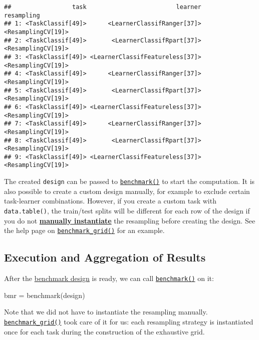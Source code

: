 \documentclass[
]{scrbook}
\newenvironment{Shaded}{\begin{snugshade}}{\end{snugshade}}
\newcommand{\FunctionTok}[1]{\textcolor[rgb]{0.00,0.00,0.00}{#1}}
\newcommand{\NormalTok}[1]{#1}
\newcommand{\OtherTok}[1]{\textcolor[rgb]{0.56,0.35,0.01}{#1}}
\renewenvironment{Shaded} {\begin{snugshade}\small} {\end{snugshade}}
\begin{document}
\begin{verbatim}
##                 task                         learner         resampling
## 1: <TaskClassif[49]>      <LearnerClassifRanger[37]> <ResamplingCV[19]>
## 2: <TaskClassif[49]>       <LearnerClassifRpart[37]> <ResamplingCV[19]>
## 3: <TaskClassif[49]> <LearnerClassifFeatureless[37]> <ResamplingCV[19]>
## 4: <TaskClassif[49]>      <LearnerClassifRanger[37]> <ResamplingCV[19]>
## 5: <TaskClassif[49]>       <LearnerClassifRpart[37]> <ResamplingCV[19]>
## 6: <TaskClassif[49]> <LearnerClassifFeatureless[37]> <ResamplingCV[19]>
## 7: <TaskClassif[49]>      <LearnerClassifRanger[37]> <ResamplingCV[19]>
## 8: <TaskClassif[49]>       <LearnerClassifRpart[37]> <ResamplingCV[19]>
## 9: <TaskClassif[49]> <LearnerClassifFeatureless[37]> <ResamplingCV[19]>
\end{verbatim}

The created \texttt{design} can be passed to \href{https://mlr3.mlr-org.com/reference/benchmark.html}{\texttt{benchmark()}} to start the computation.
It is also possible to create a custom design manually, for example to exclude certain task-learner combinations.
However, if you create a custom task with \texttt{data.table()}, the train/test splits will be different for each row of the design if you do not \protect\hyperlink{resampling-inst}{\textbf{manually instantiate}} the resampling before creating the design.
See the help page on \href{https://mlr3.mlr-org.com/reference/benchmark_grid.html}{\texttt{benchmark\_grid()}} for an example.

\hypertarget{bm-exec}{%
\subsection{Execution and Aggregation of Results}\label{bm-exec}}

After the \protect\hyperlink{bm-design}{benchmark design} is ready, we can call \href{https://mlr3.mlr-org.com/reference/benchmark.html}{\texttt{benchmark()}} on it:

\begin{Shaded}
\begin{Highlighting}[]
\NormalTok{bmr }\OtherTok{=} \FunctionTok{benchmark}\NormalTok{(design)}
\end{Highlighting}
\end{Shaded}

Note that we did not have to instantiate the resampling manually.
\href{https://mlr3.mlr-org.com/reference/benchmark_grid.html}{\texttt{benchmark\_grid()}} took care of it for us: each resampling strategy is instantiated once for each task during the construction of the exhaustive grid.
\end{document}
